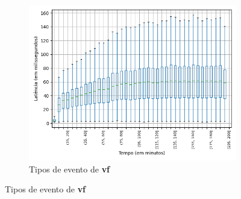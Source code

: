 \begin{figure}
\centering
\begin{subfigure}{.5\textwidth}
\centering
\includegraphics[width=\textwidth]{figuras/graphics/boxplot_5-dez-su_vf.png}
\caption{Tipos de evento de \textbf{vf}}
\label{fig:BoxPlot_vf_SU_1}
\end{subfigure}%


\end{figure}
